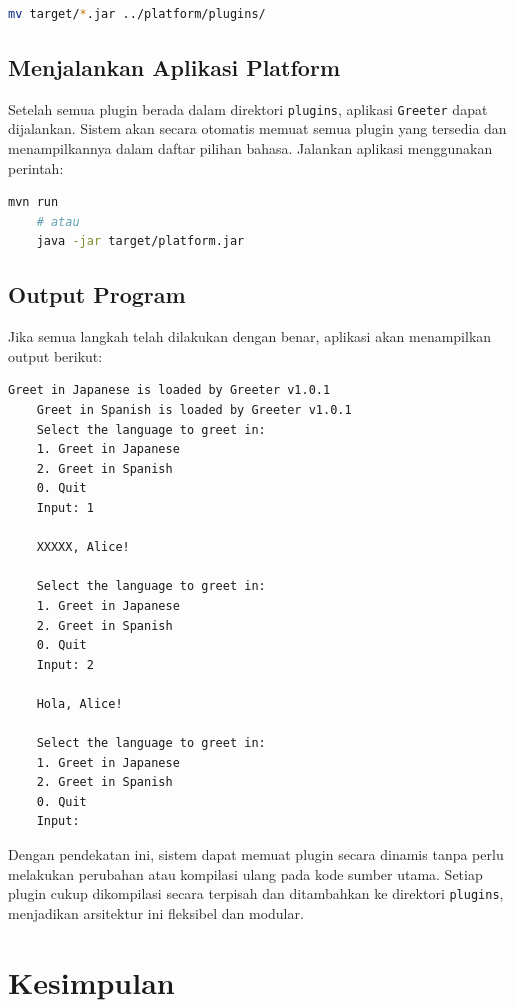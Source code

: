 \begin{lstlisting}[language=bash, caption={Memindahkan Plugin ke Direktori \texttt{plugins}}]
	mv target/*.jar ../platform/plugins/
\end{lstlisting}

\subsection{Menjalankan Aplikasi Platform}

Setelah semua plugin berada dalam direktori \texttt{plugins}, aplikasi \texttt{Greeter} dapat dijalankan. Sistem akan secara otomatis memuat semua plugin yang tersedia dan menampilkannya dalam daftar pilihan bahasa. Jalankan aplikasi menggunakan perintah:

\begin{lstlisting}[language=bash, caption={Menjalankan Aplikasi Platform}]
	mvn run 
	# atau
	java -jar target/platform.jar
\end{lstlisting}

\subsection{Output Program}

Jika semua langkah telah dilakukan dengan benar, aplikasi akan menampilkan output berikut:

\begin{lstlisting}[language=bash, caption={Contoh Output Saat Menjalankan Aplikasi}]
	Greet in Japanese is loaded by Greeter v1.0.1
	Greet in Spanish is loaded by Greeter v1.0.1
	Select the language to greet in:
	1. Greet in Japanese
	2. Greet in Spanish
	0. Quit
	Input: 1
	
	XXXXX, Alice!
	
	Select the language to greet in:
	1. Greet in Japanese
	2. Greet in Spanish
	0. Quit
	Input: 2
	
	Hola, Alice!
	
	Select the language to greet in:
	1. Greet in Japanese
	2. Greet in Spanish
	0. Quit
	Input:
\end{lstlisting}

Dengan pendekatan ini, sistem dapat memuat plugin secara dinamis tanpa perlu melakukan perubahan atau kompilasi ulang pada kode sumber utama. Setiap plugin cukup dikompilasi secara terpisah dan ditambahkan ke direktori \texttt{plugins}, menjadikan arsitektur ini fleksibel dan modular.


\section{Kesimpulan}

